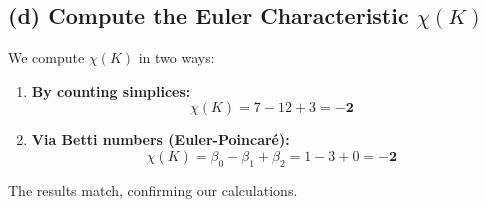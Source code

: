 \documentclass{article}
\begin{document}
\subsection*{(d) Compute the Euler Characteristic $\chi(K)$}
We compute $\chi(K)$ in two ways:
\begin{enumerate}
    \item \textbf{By counting simplices:}
    $$ \chi(K) = 7 - 12 + 3 = \mathbf{-2} $$
    \item \textbf{Via Betti numbers (Euler-Poincaré):}
    $$ \chi(K) = \beta_0 - \beta_1 + \beta_2 = 1 - 3 + 0 = \mathbf{-2} $$
\end{enumerate}
The results match, confirming our calculations.
\end{document}
